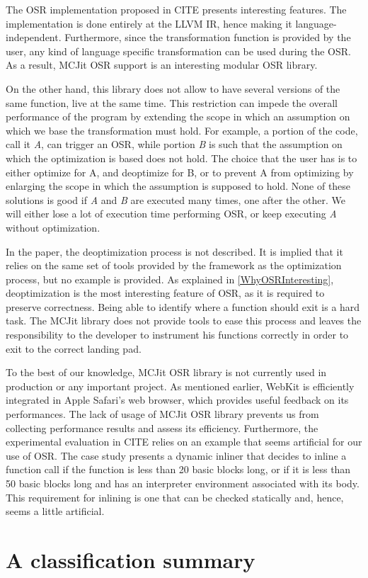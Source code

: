 The OSR implementation proposed in CITE presents interesting features.
The implementation is done entirely at the LLVM IR, hence making it language-independent.
Furthermore, since the transformation function is provided by the user, any kind of language specific transformation can be used during the OSR.
As a result, MCJit OSR support is an interesting modular OSR library.

On the other hand, this library does not allow to have several versions of the same function, live at the same time.
This restriction can impede the overall performance of the program by extending the scope in which an assumption on which we base the transformation must hold.
For example, a portion of the code, call it \textit{A}, can trigger an OSR, while portion \textit{B} is such that the assumption on which the optimization is based does not hold.
The choice that the user has is to either optimize for A, and deoptimize for B, or to prevent A from optimizing by enlarging the scope in which the assumption is supposed to hold.
None of these solutions is good if \textit{A} and \textit{B} are executed many times, one after the other.
We will either lose a lot of execution time performing OSR, or keep executing \textit{A} without optimization.

In the paper, the deoptimization process is not described. 
It is implied that it relies on the same set of tools provided by the framework as the optimization process, but no example is provided.
As explained in \ref{WhyOSRInteresting}, deoptimization is the most interesting feature of OSR, as it is required to preserve correctness.
Being able to identify where a function should exit is a hard task.
The MCJit library does not provide tools to ease this process and leaves the responsibility to the developer to instrument his functions correctly in order to exit to the correct landing pad.

To the best of our knowledge, MCJit OSR library is not currently used in production or any important project.
As mentioned earlier, WebKit is efficiently integrated in Apple Safari's web browser, which provides useful feedback on its performances.
The lack of usage of MCJit OSR library prevents us from collecting performance results and assess its efficiency.
Furthermore, the experimental evaluation in CITE relies on an example that seems artificial for our use of OSR. 
The case study presents a dynamic inliner that decides to inline a function call if the function is less than 20 basic blocks long, or if it is less than 50 basic blocks long and has an interpreter environment associated with its body. 
This requirement for inlining is one that can be checked statically and, hence, seems a little artificial.\\

\section{A classification summary}

